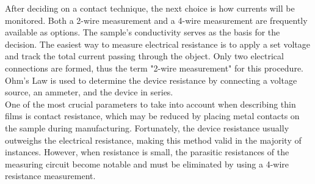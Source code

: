 
\noindent After deciding on a contact technique, the next choice is how currents will be monitored. Both a 2-wire measurement and a 4-wire measurement are frequently available as options. The sample's conductivity serves as the basis for the decision. The easiest way to measure electrical resistance is to apply a set voltage and track the total current passing through the object. Only two electrical connections are formed, thus the term "2-wire measurement" for this procedure. Ohm's Law is used to determine the device resistance by connecting a voltage source, an ammeter, and the device in series. \\


\noindent One of the most crucial parameters to take into account when describing thin films is contact resistance, which may be reduced by placing metal contacts on the sample during manufacturing. Fortunately, the device resistance usually outweighs the electrical resistance, making this method valid in the majority of instances. However, when resistance is small, the parasitic resistances of the measuring circuit become notable and must be eliminated by using a 4-wire resistance measurement. \\

